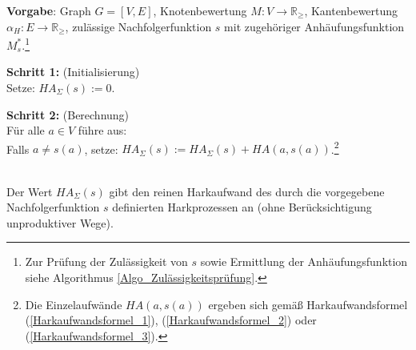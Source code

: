\begin{algo}\label{Algo_Bestimmung_Harkaufwand}
\textbf{Vorgabe}: Graph $G=[V,E]$, Knotenbewertung $M:V \rightarrow \mathbb{R}_\geq$, Kantenbewertung $\alpha_H: E \rightarrow \mathbb{R}_\geq$, zulässige Nachfolgerfunktion $s$ mit zugehöriger Anhäufungsfunktion $M^*_s$.\footnote{Zur Prüfung der Zulässigkeit von $s$ sowie Ermittlung der Anhäufungsfunktion siehe Algorithmus \ref{Algo_Zulässigkeitsprüfung}.}

\noindent 
\textbf{Schritt 1:} (Initialisierung)\\
\phantom \quad Setze: $HA_{\Sigma}(s) := 0$. 

\noindent 
\textbf{Schritt 2:} (Berechnung)\\
\phantom \quad Für alle $a \in V$ führe aus:\\
\phantom \quad \qquad Falls $a \neq s(a)$, setze: $HA_{\Sigma}(s) := HA_{\Sigma}(s) + HA(a,s(a))$.\footnote{Die Einzelaufwände $HA(a,s(a))$ ergeben sich gemäß Harkaufwandsformel (\ref{Harkaufwandsformel_1}), (\ref{Harkaufwandsformel_2}) oder (\ref{Harkaufwandsformel_3}).}
\end{algo}

\phantom \\
\noindent Der Wert $HA_{\Sigma}(s)$ gibt den reinen Harkaufwand des durch die vorgegebene Nachfolgerfunktion $s$ definierten Harkprozessen an (ohne Berücksichtigung unproduktiver Wege).\\

